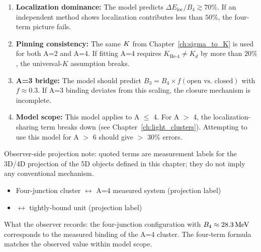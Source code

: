 \begin{edcopenbox}[title=Falsifiability Hooks]
    \begin{enumerate}
        \item \textbf{Localization dominance:} The model predicts
              $\Delta E_{\text{loc}}/B_4 \gtrsim 70\%$. If an independent
              method shows localization contributes less than $50\%$,
              the four-term picture fails.

        \item \textbf{Pinning consistency:} The same $K$ from
              Chapter~\ref{ch:sigma_to_K} is used for both A=2 and A=4.
              If fitting A=4 requires $K_{\text{He-4}} \neq K_d$ by
              more than $20\%$, the universal-$K$ assumption breaks.

        \item \textbf{A=3 bridge:} The model should predict
              $B_3 = B_4 \times f(\text{open vs.\ closed})$ with
              $f \approx 0.3$. If A=3 binding deviates from this
              scaling, the closure mechanism is incomplete.

        \item \textbf{Model scope:} This model applies to A $\leq$ 4.
              For A $>$ 4, the localization-sharing term breaks down
              (see Chapter~\ref{ch:light_clusters}). Attempting to use
              this model for A $>$ 6 should give $>$ 30\% errors.
    \end{enumerate}
\end{edcopenbox}


\begin{observerbox}
Observer-side projection note: quoted terms are measurement labels for the
3D/4D projection of the 5D objects defined in this chapter; they do not
imply any conventional mechanism.

\begin{itemize}
    \item Four-junction cluster $\leftrightarrow$ A=4 measured system (projection label)
    \item \ClosedFour{} $\leftrightarrow$ tightly-bound unit (projection label)
\end{itemize}

What the observer records: the four-junction configuration with
$B_4 \approx 28.3\,\mathrm{MeV}$ corresponds to the measured binding of the
A=4 cluster. The four-term formula matches the observed value within
model scope.
\end{observerbox}

